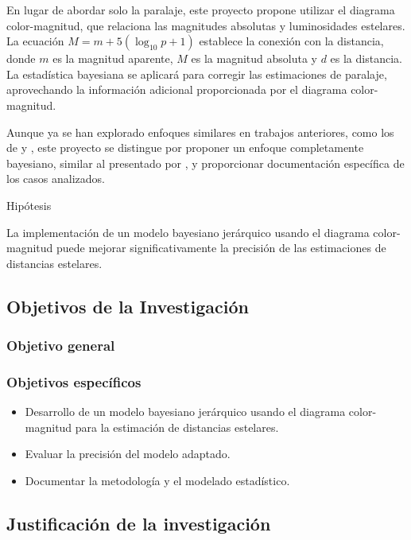 \documentclass[stu, 12pt, letterpaper, donotrepeattitle, floatsintext, natbib]{apa7}
\begin{document}
En lugar de abordar solo la paralaje, este proyecto propone utilizar
el diagrama color-magnitud, que relaciona las magnitudes absolutas y
luminosidades estelares. La ecuación $\displaystyle M=m+5\left(\log_{10}p+1\right)$ 
establece la conexión con la distancia, donde $m$ es la magnitud aparente, $M$ es la
magnitud absoluta y $d$ es la distancia. La estadística bayesiana se
aplicará para corregir las estimaciones de paralaje, aprovechando
la información adicional proporcionada por el diagrama color-magnitud.

Aunque ya se han explorado enfoques similares en trabajos anteriores,
como los de  y ,
este proyecto se distingue por proponer un enfoque completamente bayesiano,
similar al presentado por , y proporcionar documentación
específica de los casos analizados.

Hipótesis

La implementación de un modelo bayesiano jerárquico usando el diagrama
color-magnitud puede mejorar significativamente la precisión de las
estimaciones de distancias estelares.

\subsection{Objetivos de la Investigación}

\subsubsection{Objetivo general}

\subsubsection{Objetivos específicos}

\begin{itemize}
    \item Desarrollo de un modelo bayesiano jerárquico usando el diagrama color-magnitud para la estimación de distancias estelares.
    \item Evaluar la precisión del modelo adaptado.
    \item Documentar la metodología y el modelado estadístico.
\end{itemize}

\subsection{Justificación de la investigación}
\end{document}
